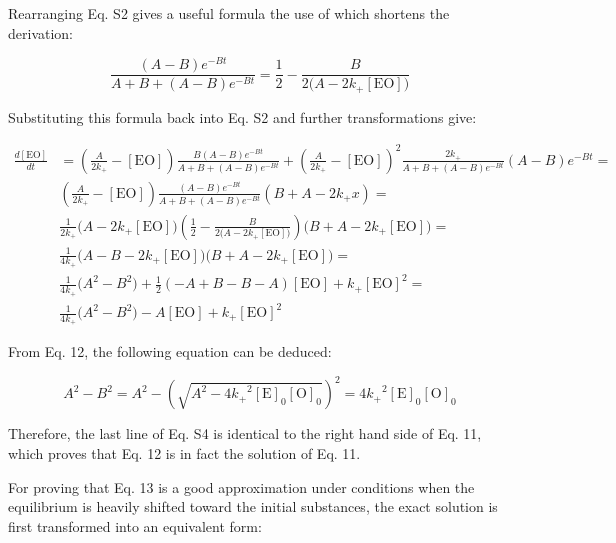 \documentclass{article}
\begin{document}
Rearranging Eq. S2 gives a useful formula the use of which shortens the derivation:

\begin{equation}
\frac{(A - B)e^{-Bt}}{A + B + (A - B)e^{-Bt}} = \frac{1}{2} - \frac{B}{2\bigl(A - 2k_+[\mathrm{EO}]\bigr)} \tag{S3}
\end{equation}

Substituting this formula back into Eq. S2 and further transformations give:

\begin{equation}
\begin{split}
\frac{d[\mathrm{EO}]}{dt} &= \left(\frac{A}{2k_+} - [\mathrm{EO}]\right)\frac{B(A - B)e^{-Bt}}{A + B + (A - B)e^{-Bt}} + \left(\frac{A}{2k_+} - [\mathrm{EO}]\right)^2\frac{2k_+}{A + B + (A - B)e^{-Bt}}(A - B)e^{-Bt} =\\[4pt]
&\left(\frac{A}{2k_+} - [\mathrm{EO}]\right)\frac{(A - B)e^{-Bt}}{A + B + (A - B)e^{-Bt}}(B + A - 2k_+x) =\\[4pt]
&\frac{1}{2k_+}\bigl(A - 2k_+[\mathrm{EO}]\bigr)\left(\frac{1}{2} - \frac{B}{2\bigl(A - 2k_+[\mathrm{EO}]\bigr)}\right)\bigl(B + A - 2k_+[\mathrm{EO}]\bigr) =\\[4pt]
&\frac{1}{4k_+}\bigl(A - B - 2k_+[\mathrm{EO}]\bigr)\bigl(B + A - 2k_+[\mathrm{EO}]\bigr) =\\[4pt]
&\frac{1}{4k_+}\bigl(A^2 - B^2\bigr) + \frac{1}{2}(-A + B - B - A)[\mathrm{EO}] + k_+[\mathrm{EO}]^2 =\\[4pt]
&\frac{1}{4k_+}\bigl(A^2 - B^2\bigr) - A[\mathrm{EO}] + k_+[\mathrm{EO}]^2
\end{split} \tag{S4}
\end{equation}

From Eq. 12, the following equation can be deduced:

\begin{equation}
A^2 - B^2 = A^2 - \left(\sqrt{A^2 - 4{k_+}^2[\mathrm{E}]_0[\mathrm{O}]_0}\right)^2 = 4{k_+}^2[\mathrm{E}]_0[\mathrm{O}]_0 \tag{S5}
\end{equation}

Therefore, the last line of Eq. S4 is identical to the right hand side of Eq. 11, which proves that Eq. 12 is in fact the solution of Eq. 11.

For proving that Eq. 13 is a good approximation under conditions when the equilibrium is heavily shifted toward the initial substances, the exact solution is first transformed into an equivalent form:
\end{document}
